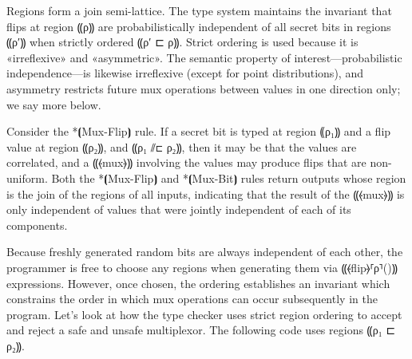 Regions form a join semi-lattice.
%
The type system maintains the invariant that flips at region ⸨ρ⸩ are
probabilistically independent of all secret bits in regions ⸨ρ′⸩ when
strictly ordered ⸨ρ′ ⊏ ρ⸩. Strict ordering is used because it is
«irreflexive» and «asymmetric». The semantic property of
interest—probabilistic independence—is likewise irreflexive (except
for point distributions), and asymmetry restricts future mux operations
between values in one direction only; we say more below.

Consider the *⦗Mux-Flip⦘ rule. If a secret
bit is typed at region ⸨ρ₁⸩ and a flip value at region ⸨ρ₂⸩, and ⸨ρ₁ ⫽⊏ ρ₂⸩,
then it may be that the values are correlated, and a ⸨⦑mux⦒⸩ involving the
values may produce flips that are non-uniform.
Both the *⦗Mux-Flip⦘ and *⦗Mux-Bit⦘ rules return outputs whose region is the join
of the regions of all inputs, indicating that the result of the ⸨⦑mux⦒⸩ is only
independent of values that were jointly independent of each of its components.

Because freshly generated random bits are always independent of each other, the
programmer is free to choose any regions when generating them via ⸨⦑flip⦒⸢ρ⸣()⸩
expressions. However, once chosen, the ordering establishes an invariant which
constrains the order in which mux operations can occur subsequently in the
program.
Let's look at how the type checker uses strict region ordering to accept and reject a safe and unsafe
multiplexor. The following code uses regions ⸨ρ₁ ⊏ ρ₂⸩.

\lstset{language=Caml,style=customcaml}

